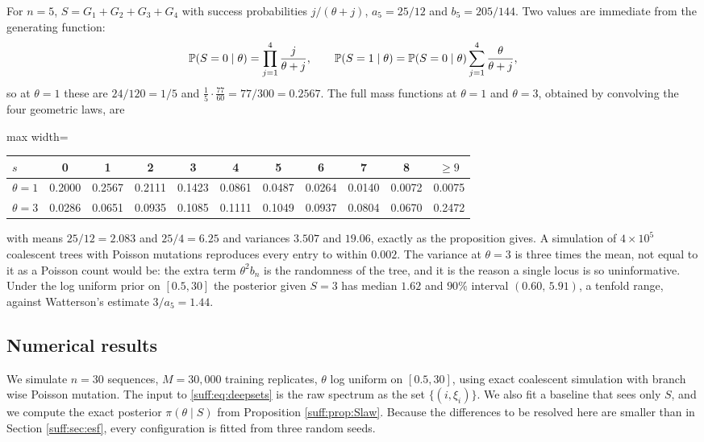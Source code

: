 \begin{example}
\label{suff:ex:five}
For $n=5$, $S=G_1+G_2+G_3+G_4$ with success probabilities $j/(\theta+j)$, $a_5=25/12$ and
$b_5=205/144$. Two values are immediate from the generating function:
\[
\mathbb{P}(S=0\mid\theta)=\prod_{j=1}^{4}\frac{j}{\theta+j},\qquad
\mathbb{P}(S=1\mid\theta)=\mathbb{P}(S=0\mid\theta)\sum_{j=1}^{4}\frac{\theta}{\theta+j},
\]
so at $\theta=1$ these are $24/120=1/5$ and $\tfrac15\cdot\tfrac{77}{60}=77/300=0.2567$. The
full mass functions at $\theta=1$ and $\theta=3$, obtained by convolving the four geometric
laws, are
\begin{center}
\begin{adjustbox}{max width=\textwidth}
\begin{tabular}{lcccccccccc}
\toprule
$s$ & 0 & 1 & 2 & 3 & 4 & 5 & 6 & 7 & 8 & $\ge9$ \\
\midrule
$\theta=1$ & 0.2000 & 0.2567 & 0.2111 & 0.1423 & 0.0861 & 0.0487 & 0.0264 & 0.0140 & 0.0072 & 0.0075 \\
$\theta=3$ & 0.0286 & 0.0651 & 0.0935 & 0.1085 & 0.1111 & 0.1049 & 0.0937 & 0.0804 & 0.0670 & 0.2472 \\
\bottomrule
\end{tabular}
\end{adjustbox}
\end{center}
with means $25/12=2.083$ and $25/4=6.25$ and variances $3.507$ and $19.06$, exactly as the
proposition gives. A simulation of $4\times10^5$ coalescent trees with Poisson mutations
reproduces every entry to within $0.002$. The variance at $\theta=3$ is three times the mean,
not equal to it as a Poisson count would be: the extra term $\theta^2b_n$ is the randomness of
the tree, and it is the reason a single locus is so uninformative. Under the log uniform
prior on $[0.5,30]$ the posterior given $S=3$ has median $1.62$ and $90\%$ interval
$(0.60,\,5.91)$, a tenfold range, against Watterson's estimate $3/a_5=1.44$.
\end{example}

\subsection{Numerical results}
\label{suff:sec:simsites}

We simulate $n=30$ sequences, $M=30{,}000$ training replicates, $\theta$ log uniform on
$[0.5,30]$, using exact coalescent simulation with branch wise Poisson mutation. The input to
\eqref{suff:eq:deepsets} is the raw spectrum as the set $\{(i,\xi_i)\}$. We also fit a
baseline that sees only $S$, and we compute the exact posterior $\pi(\theta\mid S)$ from
Proposition \ref{suff:prop:Slaw}. Because the differences to be resolved here are smaller than
in Section \ref{suff:sec:esf}, every configuration is fitted from three random seeds.

